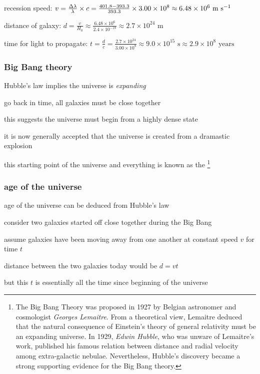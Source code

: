\sol recession speed: $v = \frac{\Delta \lambda}{\lambda} \times c = \frac{401.8-393.3}{393.3}\times 3.00\times10^8 \approx 6.48 \times 10^6 \text{ m s$^{-1}$}$

distance of galaxy: $d = \frac{v}{H_0} \approx \frac{6.48\times10^6}{2.4\times10^{-18}} \approx 2.7 \times 10^{24} \text{ m}$

time for light to propagate: $t = \frac{d}{c} = \frac{2.7 \times 10^{24}}{3.00\times10^8} \approx 9.0\times10^{15} \text{ s} \approx 2.9\times10^{8} \text{ years}$

\subsubsection{Big Bang theory}

Hubble's law implies the universe is \emph{expanding}

go back in time, all galaxies must be close together

this suggests the universe must begin from a highly dense state

it is now generally accepted that the universe is created from a dramastic explosion

this starting point of the universe and everything is known as the \footnote{The Big Bang Theory was proposed in 1927 by Belgian astronomer and cosmologist \emph{Georges Lemaitre}. From a theoretical view, Lemaitre deduced that the natural consequence of Einstein's theory of general relativity must be an expanding universe. In 1929, \emph{Edwin Hubble}, who was unware of Lemaitre's work, published his famous relation between distance and radial velocity among extra-galactic nebulae. Nevertheless, Hubble's discovery became a strong supporting evidence for the Big Bang theory.}

\subsubsection*{age of the universe}

age of the universe can be deduced from Hubble's law

consider two galaxies started off close together during the Big Bang

assume galaxies have been moving away from one another at constant speed $v$ for time $t$

distance between the two galaxies today would be $d=vt$

but this $t$ is essentially all the time since beginning of the universe

